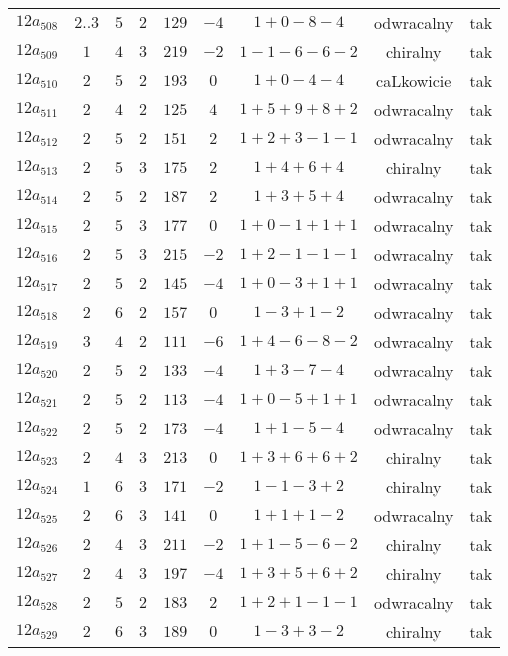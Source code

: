 \begin{longtable}{ccccccccc}
$12a_{508}$ & $2..3$ & $5$ & $2$ & $129$ & $-4$ & $1+0-8-4$ & odwracalny & tak \\
$12a_{509}$ & $1$ & $4$ & $3$ & $219$ & $-2$ & $1-1-6-6-2$ & chiralny & tak \\
$12a_{510}$ & $2$ & $5$ & $2$ & $193$ & $0$ & $1+0-4-4$ & caLkowicie & tak \\
$12a_{511}$ & $2$ & $4$ & $2$ & $125$ & $4$ & $1+5+9+8+2$ & odwracalny & tak \\
$12a_{512}$ & $2$ & $5$ & $2$ & $151$ & $2$ & $1+2+3-1-1$ & odwracalny & tak \\
$12a_{513}$ & $2$ & $5$ & $3$ & $175$ & $2$ & $1+4+6+4$ & chiralny & tak \\
$12a_{514}$ & $2$ & $5$ & $2$ & $187$ & $2$ & $1+3+5+4$ & odwracalny & tak \\
$12a_{515}$ & $2$ & $5$ & $3$ & $177$ & $0$ & $1+0-1+1+1$ & odwracalny & tak \\
$12a_{516}$ & $2$ & $5$ & $3$ & $215$ & $-2$ & $1+2-1-1-1$ & odwracalny & tak \\
$12a_{517}$ & $2$ & $5$ & $2$ & $145$ & $-4$ & $1+0-3+1+1$ & odwracalny & tak \\
$12a_{518}$ & $2$ & $6$ & $2$ & $157$ & $0$ & $1-3+1-2$ & odwracalny & tak \\
$12a_{519}$ & $3$ & $4$ & $2$ & $111$ & $-6$ & $1+4-6-8-2$ & odwracalny & tak \\
$12a_{520}$ & $2$ & $5$ & $2$ & $133$ & $-4$ & $1+3-7-4$ & odwracalny & tak \\
$12a_{521}$ & $2$ & $5$ & $2$ & $113$ & $-4$ & $1+0-5+1+1$ & odwracalny & tak \\
$12a_{522}$ & $2$ & $5$ & $2$ & $173$ & $-4$ & $1+1-5-4$ & odwracalny & tak \\
$12a_{523}$ & $2$ & $4$ & $3$ & $213$ & $0$ & $1+3+6+6+2$ & chiralny & tak \\
$12a_{524}$ & $1$ & $6$ & $3$ & $171$ & $-2$ & $1-1-3+2$ & chiralny & tak \\
$12a_{525}$ & $2$ & $6$ & $3$ & $141$ & $0$ & $1+1+1-2$ & odwracalny & tak \\
$12a_{526}$ & $2$ & $4$ & $3$ & $211$ & $-2$ & $1+1-5-6-2$ & chiralny & tak \\
$12a_{527}$ & $2$ & $4$ & $3$ & $197$ & $-4$ & $1+3+5+6+2$ & chiralny & tak \\
$12a_{528}$ & $2$ & $5$ & $2$ & $183$ & $2$ & $1+2+1-1-1$ & odwracalny & tak \\
$12a_{529}$ & $2$ & $6$ & $3$ & $189$ & $0$ & $1-3+3-2$ & chiralny & tak \\

\end{longtable}
